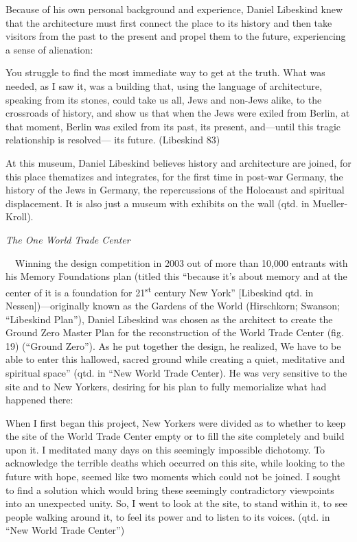 Because of his own personal background and experience, Daniel Libeskind
knew that the architecture must first connect the place to its history
and then take visitors from the past to the present and propel them to
the future, experiencing a sense of alienation: 

You struggle to find the most immediate way to get at the truth.  What
was needed, as I saw it, was a building that, using the language of
architecture, speaking from its stones, could take us all, Jews and
non-Jews alike, to the crossroads of history, and show us that when the
Jews were exiled from Berlin, at that moment, Berlin was exiled from
its past, its present, and—until this tragic relationship is resolved—
its future.  (Libeskind 83)

\textcolor[rgb]{0.06666667,0.06666667,0.06666667}{At this museum, Daniel
Libeskind believes history and architecture are joined, for this place
{\textquotedbl}thematizes and integrates, for the first time in
post-war Germany, the history of the Jews in Germany, the repercussions
of the Holocaust and spiritual displacement.  It is also just a museum
with exhibits on the wall{\textquotedbl} (qtd. in }Mueller-Kroll).  

\textit{The One World Trade Center}

\ \ Winning the design competition in 2003 out of more than 10,000
entrants with his Memory Foundations plan (titled this “because it’s
about memory and at the center of it is a foundation for
21\textsuperscript{st} century New York” [Libeskind qtd. in
Nessen])—originally known as the Gardens of the World (Hirschkorn;
Swanson; “Libeskind Plan”), Daniel Libeskind was chosen as the
architect to create the Ground Zero Master Plan for the reconstruction
of the World Trade Center (fig. 19) (“Ground Zero”).  As he put
together the design, he realized, {\textquotedbl}We have to be able to
enter this hallowed, sacred ground while creating a quiet, meditative
and spiritual space” (qtd. in “New World Trade Center).  He was very
sensitive to the site and to New Yorkers, desiring for his plan to
fully memorialize what had happened there: 

When I first began this project, New Yorkers were divided as to whether
to keep the site of the World Trade Center empty or to fill the site
completely and build upon it.  I meditated many days on this seemingly
impossible dichotomy.  To acknowledge the terrible deaths which
occurred on this site, while looking to the future with hope, seemed
like two moments which could not be joined.  I sought to find a
solution which would bring these seemingly contradictory viewpoints
into an unexpected unity.  So, I went to look at the site, to stand
within it, to see people walking around it, to feel its power and to
listen to its voices.  (qtd. in “New World Trade Center”)

